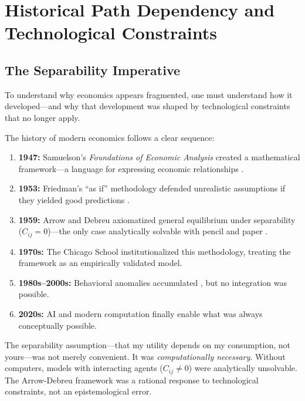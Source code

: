\documentclass[12pt,a4paper]{article}
\theoremstyle{definition}
\begin{document}
\section{Historical Path Dependency and Technological Constraints}
\label{sec:history}

\subsection{The Separability Imperative}

To understand why economics appears fragmented, one must understand how it developed---and why that development was shaped by technological constraints that no longer apply.

The history of modern economics follows a clear sequence:

\begin{enumerate}
    \item \textbf{1947:} Samuelson's \emph{Foundations of Economic Analysis} created a mathematical framework---a language for expressing economic relationships \citep{samuelson1947}.

    \item \textbf{1953:} Friedman's ``as if'' methodology defended unrealistic assumptions if they yielded good predictions \citep{friedman1953}.

    \item \textbf{1959:} Arrow and Debreu axiomatized general equilibrium under separability ($C_{ij} = 0$)---the only case analytically solvable with pencil and paper \citep{arrowdebreu1954}.

    \item \textbf{1970s:} The Chicago School institutionalized this methodology, treating the framework as an empirically validated model.

    \item \textbf{1980s--2000s:} Behavioral anomalies accumulated \citep{kahnemantversky1979,guth1982,fehrschmidt1999}, but no integration was possible.

    \item \textbf{2020s:} AI and modern computation finally enable what was always conceptually possible.
\end{enumerate}

The separability assumption---that my utility depends on my consumption, not yours---was not merely convenient. It was \emph{computationally necessary}. Without computers, models with interacting agents ($C_{ij} \neq 0$) were analytically unsolvable. The Arrow-Debreu framework was a rational response to technological constraints, not an epistemological error.
\end{document}
